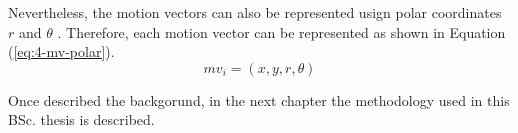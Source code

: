 \newpage
Nevertheless, the motion vectors can also be represented usign polar coordinates $r$ and $\theta$ \cite{GRMSJ12}. Therefore, each motion vector can be represented as shown in Equation (\ref{eq:4-mv-polar}).
\begin{equation} \label{eq:4-mv-polar}
mv_{i} = (x, y, r, \theta)
\end{equation} 

Once described the backgorund, in the next chapter the methodology used in this \ac{BSc.} thesis is described.




